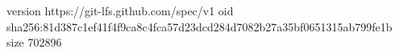 version https://git-lfs.github.com/spec/v1
oid sha256:81d387c1ef41f4f9ca8c4fca57d23dcd284d7082b27a35bf0651315ab799fe1b
size 702896
